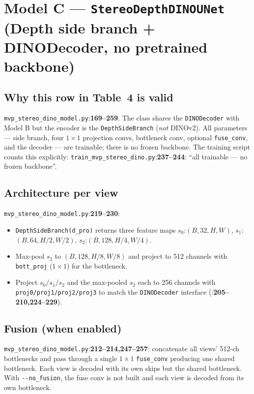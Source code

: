\documentclass[11pt]{article}
\newcommand{\fref}[2]{\texttt{\textcolor{filegray}{#1}}:\textbf{#2}}
\begin{document}
\section{Model C --- \texttt{StereoDepthDINOUNet}
(Depth side branch + DINODecoder, no pretrained backbone)}

\subsection{Why this row in Table~4 is valid}
\fref{mvp\_stereo\_dino\_model.py}{169--259}. The class shares the
\texttt{DINODecoder} with Model B but the encoder is the
\texttt{DepthSideBranch} (\emph{not} DINOv2). All parameters --- side
branch, four $1{\times}1$ projection convs, bottleneck conv, optional
\texttt{fuse\_conv}, and the decoder --- are trainable; there is no
frozen backbone. The training script counts this explicitly:
\fref{train\_mvp\_stereo\_dino.py}{237--244}: ``all trainable --- no
frozen backbone''.

\subsection{Architecture per view}
\fref{mvp\_stereo\_dino\_model.py}{219--230}:
\begin{itemize}[leftmargin=2em]
  \item \texttt{DepthSideBranch(d\_pro)} returns three feature maps
        $s_0$:$(B,32,H,W)$, $s_1$:$(B,64,H/2,W/2)$, $s_2$:$(B,128,H/4,W/4)$.
  \item Max-pool $s_2$ to $(B,128,H/8,W/8)$ and project to 512 channels
        with \texttt{bott\_proj} ($1{\times}1$) for the bottleneck.
  \item Project $s_0/s_1/s_2$ and the max-pooled $s_2$ each to 256
        channels with \texttt{proj0/proj1/proj2/proj3} to match the
        \texttt{DINODecoder} interface
        (\fref{}{205--210,224--229}).
\end{itemize}

\subsection{Fusion (when enabled)}
\fref{mvp\_stereo\_dino\_model.py}{212--214,247--257}: concatenate all
views' 512-ch bottlenecks and pass through a single
$1{\times}1$ \texttt{fuse\_conv} producing one shared bottleneck. Each
view is decoded with its own skips but the shared bottleneck. With
\texttt{-{}-no\_fusion}, the fuse conv is not built and each view is
decoded from its own bottleneck.
\end{document}
